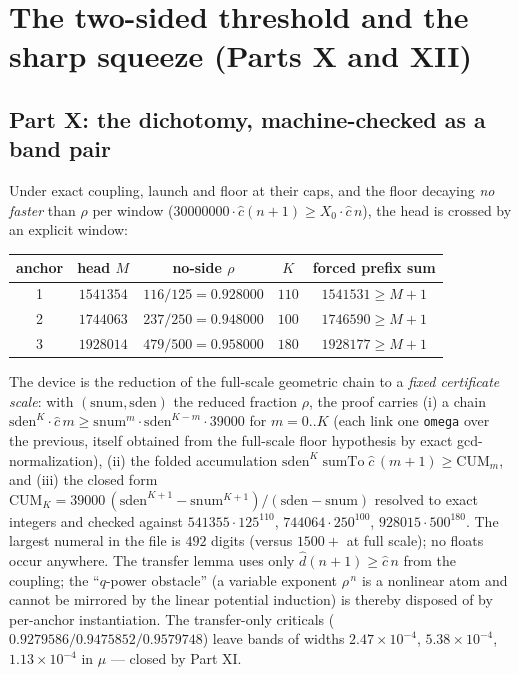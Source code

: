 \documentclass[11pt]{article}
\newcommand{\dhat}{\widehat{d}}
\newcommand{\chat}{\widehat{c}}
\newcommand{\sumto}{\operatorname{sumTo}}
\theoremstyle{plain}
\theoremstyle{definition}
\begin{document}
\section{The two-sided threshold and the sharp squeeze (Parts X and XII)}\label{sec:sharp}

\subsection{Part X: the dichotomy, machine-checked as a band pair}
Under exact coupling, launch and floor at their caps, and the floor decaying \emph{no
faster} than $\rho$ per window ($30000000\cdot\chat(n+1)\ge X_0\cdot\chat\,n$), the head is
crossed by an explicit window:

\begin{center}
\begin{tabular}{c c c c c}
\hline
\textbf{anchor} & head $M$ & no-side $\rho$ & $K$ & forced prefix sum\\
\hline
1 & $1541354$ & $116/125=0.928000$ & $110$ & $1541531\ge M+1$\\
2 & $1744063$ & $237/250=0.948000$ & $100$ & $1746590\ge M+1$\\
3 & $1928014$ & $479/500=0.958000$ & $180$ & $1928177\ge M+1$\\
\hline
\end{tabular}
\end{center}

The device is the reduction of the full-scale geometric chain to a \emph{fixed certificate
scale}: with $(\mathrm{snum},\mathrm{sden})$ the reduced fraction $\rho$, the proof carries
(i) a chain $\mathrm{sden}^{K}\cdot\chat\,m\ge \mathrm{snum}^{m}\cdot\mathrm{sden}^{K-m}\cdot 39000$
for $m=0..K$ (each link one \texttt{omega} over the previous, itself obtained from the
full-scale floor hypothesis by exact gcd-normalization), (ii) the folded accumulation
$\mathrm{sden}^{K}\sumto\chat\,(m+1)\ge \mathrm{CUM}_m$, and (iii) the closed form
$\mathrm{CUM}_K=39000\,(\mathrm{sden}^{K+1}-\mathrm{snum}^{K+1})/(\mathrm{sden}-\mathrm{snum})$
resolved to exact integers and checked against $541355\cdot 125^{110}$,
$744064\cdot 250^{100}$, $928015\cdot 500^{180}$. The largest numeral in the file is
$492$ digits (versus $1500+$ at full scale); no floats occur anywhere. The transfer lemma
uses only $\dhat(n+1)\ge\chat\,n$ from the coupling; the ``$q$-power obstacle''
(a variable exponent $\rho^{\,n}$ is a nonlinear atom and cannot be mirrored by the
linear potential induction) is thereby disposed of by per-anchor instantiation. The
transfer-only criticals ($0.9279586/0.9475852/0.9579748$) leave bands of widths
$2.47\times 10^{-4}$, $5.38\times 10^{-4}$, $1.13\times 10^{-4}$ in $\mu$ --- closed by
Part XI.
\end{document}
